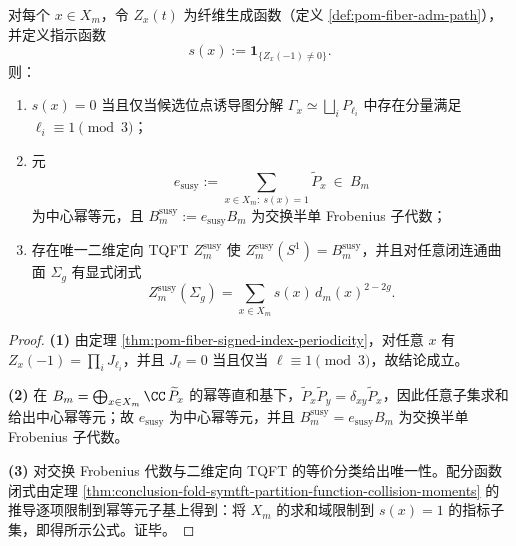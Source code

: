 \begin{theorem}\label{thm:conclusion-tqft-witten-index-susy-subtqft}
对每个 \(x\in X_m\)，令 \(Z_x(t)\) 为纤维生成函数（定义 \ref{def:pom-fiber-adm-path}），并定义指示函数
\[
s(x):=\mathbf{1}_{\{Z_x(-1)\neq 0\}}.
\]
则：
\begin{enumerate}
  \item \(s(x)=0\) 当且仅当候选位点诱导图分解 \(\Gamma_x\simeq\bigsqcup_i P_{\ell_i}\) 中存在分量满足 \(\ell_i\equiv 1\pmod 3\)；
  \item 元
  \[
  e_{\mathrm{susy}}:=\sum_{x\in X_m:\ s(x)=1}\widetilde P_x\ \in\ B_m
  \]
  为中心幂等元，且 \(B_m^{\mathrm{susy}}:=e_{\mathrm{susy}}B_m\) 为交换半单 Frobenius 子代数；
  \item 存在唯一二维定向 TQFT \(Z_m^{\mathrm{susy}}\) 使 \(Z_m^{\mathrm{susy}}(S^1)=B_m^{\mathrm{susy}}\)，并且对任意闭连通曲面 \(\Sigma_g\) 有显式闭式
  \[
  Z_m^{\mathrm{susy}}(\Sigma_g)=\sum_{x\in X_m}s(x)\,d_m(x)^{2-2g}.
  \]
\end{enumerate}
\end{theorem}
\begin{proof}
\textbf{(1)} 由定理 \ref{thm:pom-fiber-signed-index-periodicity}，对任意 \(x\) 有 \(Z_x(-1)=\prod_i J_{\ell_i}\)，并且 \(J_{\ell}=0\) 当且仅当 \(\ell\equiv 1\pmod 3\)，故结论成立。
\par
\textbf{(2)} 在 \(B_m=\bigoplus_{x\in X_m}\CC\,\widetilde P_x\) 的幂等直和基下，\(\widetilde P_x\widetilde P_y=\delta_{xy}\widetilde P_x\)，因此任意子集求和给出中心幂等元；故 \(e_{\mathrm{susy}}\) 为中心幂等元，并且 \(B_m^{\mathrm{susy}}=e_{\mathrm{susy}}B_m\) 为交换半单 Frobenius 子代数。
\par
\textbf{(3)} 对交换 Frobenius 代数与二维定向 TQFT 的等价分类给出唯一性。配分函数闭式由定理 \ref{thm:conclusion-fold-symtft-partition-function-collision-moments} 的推导逐项限制到幂等元子基上得到：将 \(X_m\) 的求和域限制到 \(s(x)=1\) 的指标子集，即得所示公式。证毕。
\end{proof}





